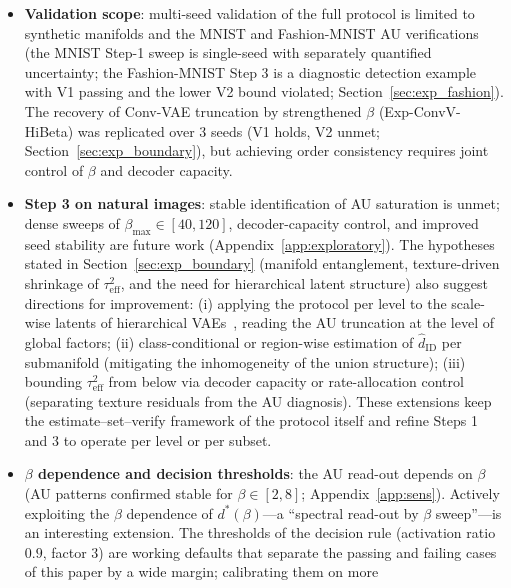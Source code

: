 \documentclass[make,article,submit,pdftex,moreauthors]{Definitions/mdpi}
\newcommand{\hatdID}{\hat{d}_{\mathrm{ID}}}
\newcommand{\dstar}{d^{*}(\beta)}
\begin{document}
\begin{itemize}
  \item \textbf{Validation scope}: multi-seed validation of the full
        protocol is limited to synthetic manifolds and the MNIST and
        Fashion-MNIST AU verifications (the MNIST Step-1 sweep is
        single-seed with separately quantified uncertainty; the
        Fashion-MNIST Step 3 is a diagnostic detection example with V1
        passing and the lower V2 bound violated;
        Section~\ref{sec:exp_fashion}).
        The recovery of Conv-VAE truncation by strengthened $\beta$
        (Exp-ConvV-HiBeta) was replicated over 3 seeds (V1 holds, V2
        unmet; Section~\ref{sec:exp_boundary}), but achieving order
        consistency requires joint control of $\beta$ and decoder
        capacity.
  \item \textbf{Step 3 on natural images}: stable identification of AU
        saturation is unmet; dense sweeps of
        $\beta_{\max} \in [40, 120]$, decoder-capacity control, and improved
        seed stability are future work (Appendix~\ref{app:exploratory}).
        The hypotheses stated in Section~\ref{sec:exp_boundary} (manifold
        entanglement, texture-driven shrinkage of $\tau^2_{\mathrm{eff}}$,
        and the need for hierarchical latent structure) also suggest
        directions for improvement:
        (i) applying the protocol per level to the scale-wise latents of
        hierarchical VAEs~\cite{sonderby2016ladder}, reading the AU
        truncation at the level of global factors;
        (ii) class-conditional or region-wise estimation of $\hatdID$ per
        submanifold (mitigating the inhomogeneity of the union structure);
        (iii) bounding $\tau^2_{\mathrm{eff}}$ from below via decoder
        capacity or rate-allocation control (separating texture residuals
        from the AU diagnosis).
        These extensions keep the estimate--set--verify framework of the
        protocol itself and refine Steps 1 and 3 to operate per level or
        per subset.
  \item \textbf{$\beta$ dependence and decision thresholds}: the AU
        read-out depends on $\beta$
        (AU patterns confirmed stable for $\beta \in [2, 8]$;
        Appendix~\ref{app:sens}).
        Actively exploiting the $\beta$ dependence of $\dstar$---a
        ``spectral read-out by $\beta$ sweep''---is an interesting
        extension.
        The thresholds of the decision rule (activation ratio $0.9$, factor
        $3$) are working defaults that separate the passing and failing
        cases of this paper by a wide margin; calibrating them on more

\end{itemize}
\end{document}
